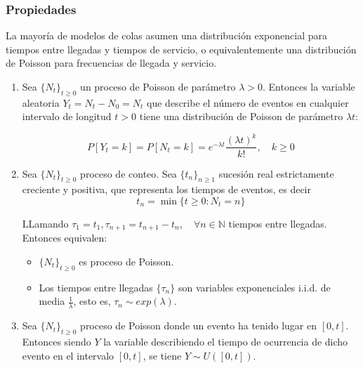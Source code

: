 \documentclass[8pt]{beamer}
\begin{document}
  \begin{frame}\frametitle{Propiedades}
    La mayoría de modelos de colas asumen una distribución exponencial para tiempos entre llegadas y tiempos 
de servicio, o equivalentemente una distribución de Poisson para frecuencias de llegada y servicio.

    \begin{enumerate}
    \item
      Sea $\{N_t\}_{t\ge 0}$ un proceso de Poisson de parámetro $\lambda > 0$. Entonces la variable aleatoria $Y_t = N_t - N_0 = N_t$ que
      describe el número de eventos en cualquier intervalo de longitud $t > 0$ tiene una distribución de Poisson de parámetro
      $\lambda t$:

      \[P[Y_t = k] = P[N_t = k] = e^{-\lambda t} \frac{(\lambda t)^k}{k!}, \quad k\ge 0\]

    \item
      Sea $\{N_t\}_{t\ge 0}$ proceso de conteo. Sea $\{t_n\}_{n\ge 1}$ sucesión real estrictamente creciente y positiva, 
      que representa los tiempos de eventos, es decir \[t_n = \min \{t \ge 0: N_t = n\}\]

      LLamando $\tau_1= t_1, \tau_{n+1} = t_{n+1} - t_{n}, \quad \forall n\in \mathbb{N}$ tiempos entre llegadas. Entonces equivalen:

      \begin{itemize}
      \item $\{N_t\}_{t\ge 0}$ es proceso de Poisson.
      \item Los tiempos entre llegadas $\{\tau_n\}$ son variables exponenciales i.i.d. de media $\frac{1}{\lambda}$, esto es,
        $\tau_n \sim exp(\lambda)$.
      \end{itemize}
    \item
      Sea $\{N_t\}_{t\ge 0}$ proceso de Poisson donde un evento ha tenido lugar en $[0,t]$. Entonces siendo $Y$ la variable
      describiendo el tiempo de ocurrencia de dicho evento en el intervalo $[0,t]$, se tiene $Y \sim U([0,t])$.

    \end{enumerate}
  \end{frame}
\end{document}
